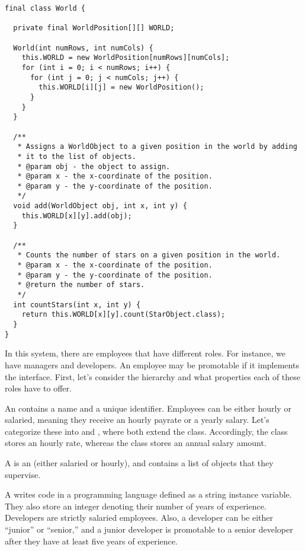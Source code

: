 \begin{lstlisting}[language=MyJava]
final class World {
  
  private final WorldPosition[][] WORLD;

  World(int numRows, int numCols) {
    this.WORLD = new WorldPosition[numRows][numCols];
    for (int i = 0; i < numRows; i++) {
      for (int j = 0; j < numCols; j++) {
        this.WORLD[i][j] = new WorldPosition();
      }
    }
  }

  /**
   * Assigns a WorldObject to a given position in the world by adding
   * it to the list of objects.
   * @param obj - the object to assign.
   * @param x - the x-coordinate of the position.
   * @param y - the y-coordinate of the position.
   */
  void add(WorldObject obj, int x, int y) {
    this.WORLD[x][y].add(obj);
  }

  /**
   * Counts the number of stars on a given position in the world.
   * @param x - the x-coordinate of the position.
   * @param y - the y-coordinate of the position.
   * @return the number of stars.
   */
  int countStars(int x, int y) {
    return this.WORLD[x][y].count(StarObject.class);
  }
}
\end{lstlisting}

In this system, there are employees that have different roles. 
For instance, we have managers and developers. 
An employee may be promotable if it implements the  interface. 
First, let's consider the hierarchy and what properties each of these roles have to offer.

An  contains a name and a unique identifier. 
Employees can be either hourly or salaried, meaning they receive an hourly payrate or a yearly salary. 
Let's categorize these into  and , where both extend the  class. 
Accordingly, the  class stores an hourly rate, whereas the  class stores an annual salary amount.

A  is an  (either salaried or hourly), and contains a list of  objects that they supervise. 

A  writes code in a programming language defined as a string instance variable. 
They also store an integer denoting their number of years of experience. 
Developers are strictly salaried employees. 
Also, a developer can be either ``junior'' or ``senior,'' and a junior developer is promotable to a senior developer after they have at least five years of experience.

